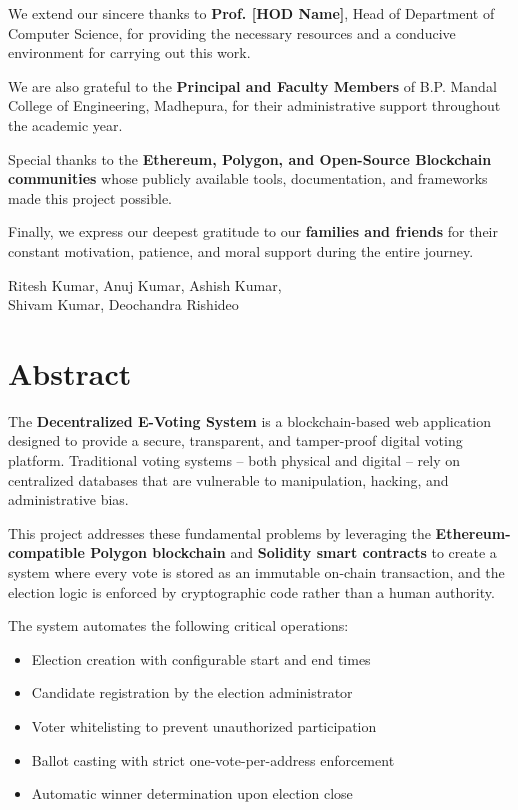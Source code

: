 \documentclass[12pt,a4paper]{report}
\begin{document}
We extend our sincere thanks to \textbf{Prof. [HOD Name]}, Head of Department
of Computer Science, for providing the necessary resources and a conducive
environment for carrying out this work.

We are also grateful to the \textbf{Principal and Faculty Members} of
B.P. Mandal College of Engineering, Madhepura, for their administrative
support throughout the academic year.

Special thanks to the \textbf{Ethereum, Polygon, and Open-Source Blockchain communities}
whose publicly available tools, documentation, and frameworks made this project
possible.

Finally, we express our deepest gratitude to our \textbf{families and friends}
for their constant motivation, patience, and moral support during the entire journey.

\vspace{2cm}
\noindent
\hfill Ritesh Kumar, Anuj Kumar, Ashish Kumar, \\
\hfill Shivam Kumar, Deochandra Rishideo

\newpage

\chapter*{Abstract}

The \textbf{Decentralized E-Voting System} is a blockchain-based web application
designed to provide a secure, transparent, and tamper-proof digital voting platform.
Traditional voting systems -- both physical and digital -- rely on centralized
databases that are vulnerable to manipulation, hacking, and administrative bias.

This project addresses these fundamental problems by leveraging the
\textbf{Ethereum-compatible Polygon blockchain} and \textbf{Solidity smart contracts}
to create a system where every vote is stored as an immutable on-chain transaction,
and the election logic is enforced by cryptographic code rather than a human authority.

The system automates the following critical operations:

\begin{itemize}
\item Election creation with configurable start and end times
\item Candidate registration by the election administrator
\item Voter whitelisting to prevent unauthorized participation
\item Ballot casting with strict one-vote-per-address enforcement
\item Automatic winner determination upon election close
\end{itemize}
\end{document}
